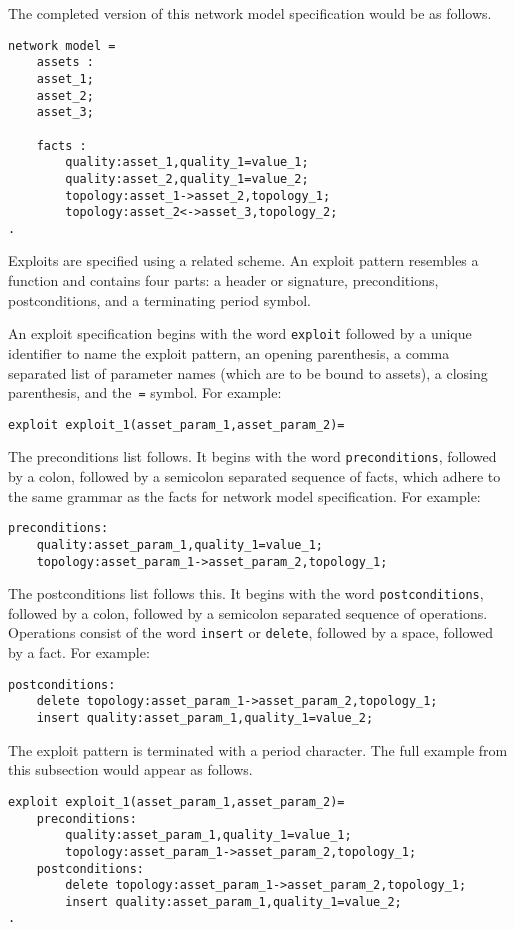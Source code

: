 The completed version of this network model specification would be as follows.
\begin{lstlisting}
network model = 
    assets :
    asset_1;
    asset_2;
    asset_3;

    facts :
        quality:asset_1,quality_1=value_1;
        quality:asset_2,quality_1=value_2;
        topology:asset_1->asset_2,topology_1;
        topology:asset_2<->asset_3,topology_2;
.
\end{lstlisting}
Exploits are specified using a related scheme. An exploit pattern resembles a function
and contains four parts: a header or signature, preconditions, postconditions, and a
terminating period symbol.

An exploit specification begins with the word \texttt{exploit} followed by a
unique identifier to name the exploit pattern, an opening parenthesis, a comma separated
list of parameter names (which are to be bound to assets), a closing parenthesis, and 
the~\texttt{=} symbol. For example:
\begin{lstlisting}
exploit exploit_1(asset_param_1,asset_param_2)=
\end{lstlisting}

The preconditions list follows. It begins with the word \texttt{preconditions}, followed
by a colon, followed by a semicolon separated sequence of facts, which adhere to the
same grammar as the facts for network model specification. For example:
\begin{lstlisting}
preconditions:
    quality:asset_param_1,quality_1=value_1;
    topology:asset_param_1->asset_param_2,topology_1;
\end{lstlisting}

The postconditions list follows this. It begins with the word \texttt{postconditions},
followed by a colon, followed by a semicolon separated sequence of operations. Operations
consist of the word \texttt{insert} or \texttt{delete}, followed by a space, followed by
a fact. For example:
\begin{lstlisting}
postconditions:
    delete topology:asset_param_1->asset_param_2,topology_1;
    insert quality:asset_param_1,quality_1=value_2;
\end{lstlisting}

The exploit pattern is terminated with a period character. The full example from this
subsection would appear as follows.
\begin{lstlisting}
exploit exploit_1(asset_param_1,asset_param_2)=
    preconditions:
        quality:asset_param_1,quality_1=value_1;
        topology:asset_param_1->asset_param_2,topology_1;
    postconditions:
        delete topology:asset_param_1->asset_param_2,topology_1;
        insert quality:asset_param_1,quality_1=value_2;
.
\end{lstlisting}

